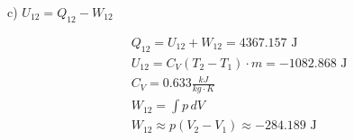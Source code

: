 c) \( U_{12} = Q_{12} - W_{12} \)

\[
\begin{aligned}
    &Q_{12} = U_{12} + W_{12} = 4367.157 \text{ J} \\
    &U_{12} = C_V (T_2 - T_1) \cdot m = -1082.868 \text{ J} \\
    &C_V = 0.633 \frac{kJ}{kg \cdot K} \\
    &W_{12} = \int p \, dV \\
    &W_{12} \approx p (V_2 - V_1) \approx -284.189 \text{ J}
\end{aligned}
\]